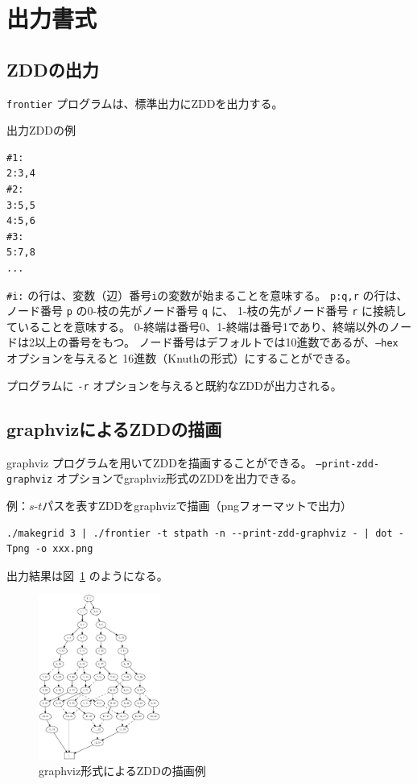 \documentclass{jsarticle}
\begin{document}
\section{出力書式}

\subsection{ZDDの出力} \label{sec:outputzdd}

\texttt{frontier} プログラムは、標準出力にZDDを出力する。

出力ZDDの例

\begin{verbatim}
#1:
2:3,4
#2:
3:5,5
4:5,6
#3:
5:7,8
...
\end{verbatim}

\texttt{\#i:} の行は、変数（辺）番号\texttt{i}の変数が始まることを意味する。
\texttt{p:q,r} の行は、ノード番号 \texttt{p} の0-枝の先がノード番号 \texttt{q} に、
1-枝の先がノード番号 \texttt{r} に接続していることを意味する。
0-終端は番号0、1-終端は番号1であり、終端以外のノードは2以上の番号をもつ。
ノード番号はデフォルトでは10進数であるが、\texttt{--hex} オプションを与えると
16進数（Knuthの形式）にすることができる。

プログラムに \texttt{-r} オプションを与えると既約なZDDが出力される。

\subsection{graphvizによるZDDの描画}

graphviz プログラムを用いてZDDを描画することができる。
\texttt{--print-zdd-graphviz} オプションでgraphviz形式のZDDを出力できる。

例：$s$-$t$パスを表すZDDをgraphvizで描画（pngフォーマットで出力）

\begin{verbatim}
./makegrid 3 | ./frontier -t stpath -n --print-zdd-graphviz - | dot -Tpng -o xxx.png
\end{verbatim}

出力結果は図~\ref{fig:zdd_example} のようになる。

\begin{figure}[h]
  \begin{center}
    \includegraphics[width=40mm]{zdd_example.eps}
  \end{center}
  \caption{graphviz形式によるZDDの描画例}
  \label{fig:zdd_example}
\end{figure}
\end{document}
